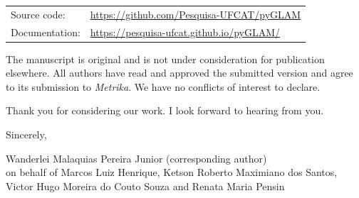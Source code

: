 \documentclass[11pt,a4paper]{article}
\begin{document}
\begin{tabular}{@{}ll}
Source code: & \url{https://github.com/Pesquisa-UFCAT/pyGLAM}\\
Documentation: & \url{https://pesquisa-ufcat.github.io/pyGLAM/}
\end{tabular}

The manuscript is original and is not under consideration for publication elsewhere. All authors have read and approved the submitted version and agree to its submission to \emph{Metrika}. We have no conflicts of interest to declare.

Thank you for considering our work. I look forward to hearing from you.

Sincerely,

\vspace{1em}
Wanderlei Malaquias Pereira Junior (corresponding author)\\
on behalf of Marcos Luiz Henrique, Ketson Roberto Maximiano dos Santos, Victor Hugo Moreira do Couto Souza and Renata Maria Pensin
\end{document}
